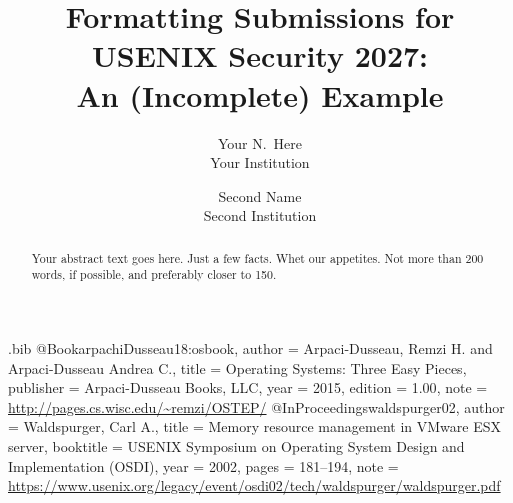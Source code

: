 \usepackage{filecontents}

\begin{filecontents}{\jobname.bib}
@Book{arpachiDusseau18:osbook,
  author =       {Arpaci-Dusseau, Remzi H. and Arpaci-Dusseau Andrea C.},
  title =        {Operating Systems: Three Easy Pieces},
  publisher =    {Arpaci-Dusseau Books, LLC},
  year =         2015,
  edition =      {1.00},
  note =         {\url{http://pages.cs.wisc.edu/~remzi/OSTEP/}}
}
@InProceedings{waldspurger02,
  author =       {Waldspurger, Carl A.},
  title =        {Memory resource management in {VMware ESX} server},
  booktitle =    {USENIX Symposium on Operating System Design and
                  Implementation (OSDI)},
  year =         2002,
  pages =        {181--194},
  note =         {\url{https://www.usenix.org/legacy/event/osdi02/tech/waldspurger/waldspurger.pdf}}}
\end{filecontents}



\date{}

\title{\Large \bf Formatting Submissions for USENIX Security 2027:\\
  An (Incomplete) Example}

\author{
{\rm Your N.\ Here}\\
Your Institution
\and
{\rm Second Name}\\
Second Institution
} %

\maketitle

\begin{abstract}
Your abstract text goes here. Just a few facts. Whet our appetites.
Not more than 200 words, if possible, and preferably closer to 150.
\end{abstract}


